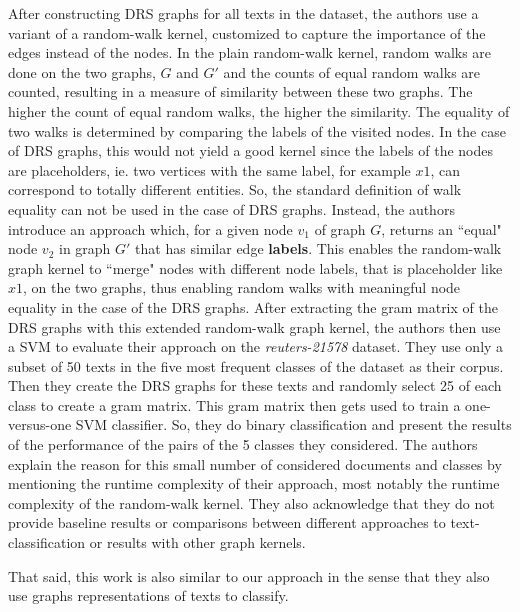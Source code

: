 After constructing DRS graphs for all texts in the dataset, the authors use a variant of a random-walk kernel, customized to capture the importance of the edges instead of the nodes.
In the plain random-walk kernel, random walks are done on the two graphs, $G$ and $G'$ and the counts of equal random walks are counted, resulting in a measure of similarity between these two graphs. The higher the count of equal random walks, the higher the similarity.
The equality of two walks is determined by comparing the labels of the visited nodes.
In the case of DRS graphs, this would not yield a good kernel since the labels of the nodes are placeholders, ie. two vertices with the same label, for example $x1$, can correspond to totally different entities.
So, the standard definition of walk equality can not be used in the case of DRS graphs.
Instead, the authors introduce an approach which, for a given node $v_1$ of graph $G$, returns an ``equal" node $v_2$ in graph $G'$ that has similar edge \textbf{labels}.
This enables the random-walk graph kernel to ``merge" nodes with different node labels, that is placeholder like $x1$, on the two graphs, thus enabling random walks with meaningful node equality in the case of the DRS graphs.
After extracting the gram matrix of the DRS graphs with this extended random-walk graph kernel, the authors then use a SVM to evaluate their approach on the \textit{reuters-21578} dataset.
They use only a subset of 50 texts in the five most frequent classes of the dataset as their corpus. Then they create the DRS graphs for these texts and randomly select 25 of each class to create a gram matrix.
This gram matrix then gets used to train a one-versus-one SVM classifier. So, they do binary classification and present the results of the performance of the pairs of the 5 classes they considered.
The authors explain the reason for this small number of considered documents and classes by mentioning the runtime complexity of their approach, most notably the runtime complexity of the random-walk kernel.
They also acknowledge that they do not provide baseline results or comparisons between different approaches to text-classification or results with other graph kernels.

That said, this work is also similar to our approach in the sense that they also use graphs representations of texts to classify.


